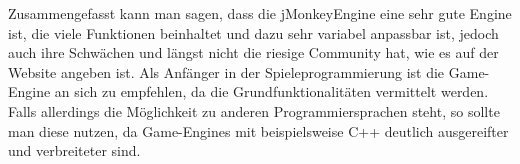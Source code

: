 Zusammengefasst kann man sagen, dass die jMonkeyEngine eine sehr gute Engine ist, die viele Funktionen beinhaltet und dazu sehr variabel anpassbar ist, jedoch auch ihre Schwächen und längst nicht die riesige Community hat, wie es auf der Website angeben ist. Als Anfänger in der Spieleprogrammierung ist die Game-Engine an sich zu empfehlen, da die Grundfunktionalitäten vermittelt werden. Falls allerdings die Möglichkeit zu anderen Programmiersprachen steht, so sollte man diese nutzen, da Game-Engines mit beispielsweise C++ deutlich ausgereifter und verbreiteter sind.

